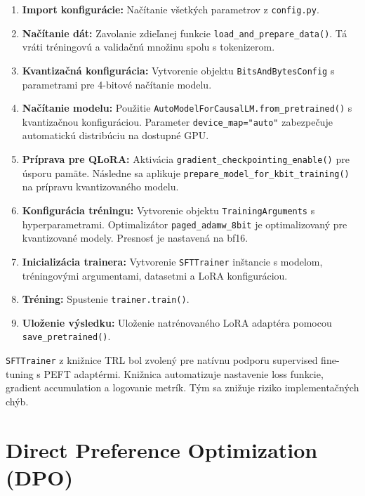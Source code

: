 \begin{enumerate}
    \item \textbf{Import konfigurácie:} Načítanie všetkých parametrov z \texttt{config.py}.
 
    \item \textbf{Načítanie dát:} Zavolanie zdieľanej funkcie \texttt{load\_and\_prepare\_data()}. Tá vráti tréningovú a validačnú množinu spolu s tokenizerom.
 
    \item \textbf{Kvantizačná konfigurácia:} Vytvorenie objektu \texttt{BitsAndBytesConfig} s parametrami pre 4-bitové načítanie modelu.
 
    \item \textbf{Načítanie modelu:} Použitie \texttt{AutoModelForCausalLM.from\_pretrained()} s kvantizačnou konfiguráciou. Parameter \texttt{device\_map="auto"} zabezpečuje automatickú distribúciu na dostupné GPU.
 
    \item \textbf{Príprava pre QLoRA:} Aktivácia \texttt{gradient\_checkpointing\_enable()} pre úsporu pamäte. Následne sa aplikuje \texttt{prepare\_model\_for\_kbit\_training()} na prípravu kvantizovaného modelu.
 
    \item \textbf{Konfigurácia tréningu:} Vytvorenie objektu \texttt{TrainingArguments} s hyperparametrami. Optimalizátor \texttt{paged\_adamw\_8bit} je optimalizovaný pre kvantizované modely. Presnosť je nastavená na bf16.
 
    \item \textbf{Inicializácia trainera:} Vytvorenie \texttt{SFTTrainer} inštancie s modelom, tréningovými argumentami, datasetmi a LoRA konfiguráciou.
 
    \item \textbf{Tréning:} Spustenie \texttt{trainer.train()}.
 
    \item \textbf{Uloženie výsledku:} Uloženie natrénovaného LoRA adaptéra pomocou \texttt{save\_\allowbreak pretrained()}.
\end{enumerate}
 
\texttt{SFTTrainer} z knižnice TRL bol zvolený pre natívnu podporu supervised fine-tuning s PEFT adaptérmi. Knižnica automatizuje nastavenie loss funkcie, gradient accumulation a logovanie metrík. Tým sa znižuje riziko implementačných chýb.
 
\section{Direct Preference Optimization (DPO)}
 

